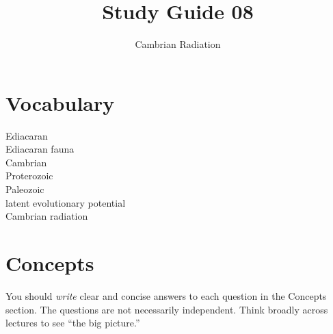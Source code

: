 \documentclass[letterpaper]{tufte-handout}
\title{Study Guide 08\hfill}
\author{Cambrian Radiation}
\date{} %
\begin{document}
\maketitle	%


\section{Vocabulary}
\vspace{-1\baselineskip}
\begin{multicols}{2}
Ediacaran\\
Ediacaran fauna\\
Cambrian\\
Proterozoic\\
Paleozoic\\
latent evolutionary potential\\
Cambrian radiation
\end{multicols}

\section{Concepts}

You should \emph{write} clear and concise answers to each question in the Concepts section.  The questions are not necessarily independent.  Think broadly across lectures to see ``the big picture.'' 
\end{document}
